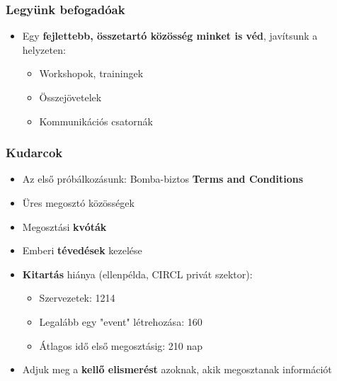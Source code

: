 \begin{frame}
  \frametitle{Legyünk befogadóak}
  \begin{itemize}
      \item Egy {\bf fejlettebb, összetartó közösség minket is véd}, javítsunk a helyzeten:
      \begin{itemize}
          \item Workshopok, trainingek
          \item Összejövetelek
          \item Kommunikációs csatornák
      \end{itemize}
  \end{itemize}
\end{frame}

\begin{frame}
  \frametitle{Kudarcok}
  \begin{itemize}
      \item Az első próbálkozásunk: Bomba-biztos {\bf Terms and Conditions}
      \item Üres megosztó közösségek
      \item Megosztási {\bf kvóták}
      \item Emberi {\bf tévedések} kezelése
      \item {\bf Kitartás} hiánya (ellenpélda, CIRCL privát szektor):
      \begin{itemize}
         \item Szervezetek: 1214
         \item Legalább egy "event" létrehozása: 160
         \item Átlagos idő első megosztásig: 210 nap
      \end{itemize}
      \item Adjuk meg a {\bf kellő elismerést} azoknak, akik megosztanak információt
  \end{itemize}
\end{frame}

